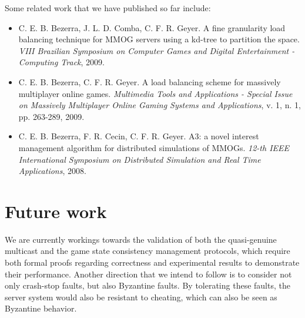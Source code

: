 \documentclass[]{usiinfprospectus}
\begin{document}
Some related work that we have published so far include:
\begin{itemize}
  \item C. E. B. Bezerra, J. L. D. Comba, C. F. R. Geyer. A fine granularity load balancing technique for MMOG servers using a kd-tree to partition the space. \textit{VIII Brazilian Symposium on Computer Games and Digital Entertainment - Computing Track}, 2009.
  \item C. E. B. Bezerra, C. F. R. Geyer. A load balancing scheme for massively multiplayer online games. \textit{Multimedia Tools and Applications - Special Issue on Massively Multiplayer Online Gaming Systems and Applications}, v. 1, n. 1, pp. 263-289, 2009.
  \item C. E. B. Bezerra, F. R. Cecin, C. F. R. Geyer. A3: a novel interest management algorithm for distributed simulations of MMOGs. \textit{12-th IEEE International Symposium on Distributed Simulation and Real Time Applications}, 2008.
\end{itemize}

\section{Future work} \label{sec:futurework}

We are currently workings towards the validation of both the quasi-genuine multicast and the game state consistency management protocols, which require both formal proofs regarding correctness and experimental results to demonstrate their performance. Another direction that we intend to follow is to consider not only crash-stop faults, but also Byzantine faults. By tolerating these faults, the server system would also be resistant to cheating, which can also be seen as Byzantine behavior.




\end{document}
